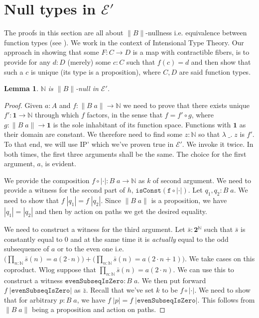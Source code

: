 \documentclass[12pt]{report}
\newtheorem{lem}[thm]{Lemma}
\theoremstyle{definition}
\begin{document}
\section{Null types in $\mathcal{E}'$}
The proofs in this section are all about $\lVert B \rVert$-nullness i.e. equivalence between function types (see ). 
We work in the context of Intensional Type Theory. 
Our approach in showing that some $F: C\rightarrow D$ is a map with contractible fibers, is to provide for any $d :D$ (merely) some $c :C$ such that $f(c) = d$ and then show that such a $c$ is unique (its type is a proposition), where $C,D$ are said function types. 
\begin{lem}\label{NisBnull}
$\mathbb{N}$ is $\lVert B \rVert$-null in $\mathcal{E}'$.
\end{lem}
\begin{proof}
Given $a : A$ and $f : \lVert B\; a \rVert \rightarrow \mathbb{N}$ we need to prove that there exists unique $f' : \mathbf{1} \rightarrow \mathbb{N}$ through which $f$ factors, in the sense that $f = f' \circ g$, where $g : \lVert B\; a \rVert \rightarrow \mathbf{1}$ is the sole inhabitant of its function space. 
Functions with $\mathbf{1}$ as their domain are constant. 
We therefore need to find some $z : \mathbb{N}$ so that $\lambda\; \_.\; z$ is $f'$. 
To that end, we will use IP' which we've proven true in $\mathcal{E}'$. 
We invoke it twice. 
In both times, the first three arguments shall be the same. 
The choice for the first argument, $a$, is evident. 

We provide the composition $f \circ |\cdot| : B\; a \rightarrow \mathbb{N}$ as $k$ of second argument. 
We need to provide a witness for the second part of $h$, $\mathtt{isConst(f \circ |\cdot|)}$. 
Let $q_1,q_2 : B\;a$. 
We need to show that $f\;|q_1| = f\; |q_2|$. 
Since $\lVert B\; a\rVert$ is a proposition, we have $|q_1| = |q_2|$ and then by action on paths we get the desired equality.

We need to construct a witness for the third argument. 
Let $\bar{s} : \mathbf{2}^\mathbb{N}$ such that $\bar{s}$ is constantly equal to $0$ and at the same time it is \textit{actually} equal to the odd subsequence of $a$ or to the even one i.e. $\big(\prod_{n : \mathbb{N}} \bar{s}(n) = a(2 \cdot n)\big) + \big(\prod_{n : \mathbb{N}} \bar{s}(n) = a(2\cdot n +1)\big)$. 
We take cases on this coproduct. 
Wlog suppose that $\prod_{n : \mathbb{N}} \bar{s}(n) = a(2 \cdot n)$. 
We can use this to construct a witness $\mathtt{evenSubseqIsZero} : B\;a$. 
We then put forward $f\;|\mathtt{evenSubseqIsZero}|$ as $\bar{z}$. 
Recall that we've set $k$ to be $f\circ |\cdot|$.
We need to show that for arbitrary $p : B\;a $, we have $f\; |p| = f\;|\mathtt{evenSubseqIsZero}|$. 
This follows from $\lVert B\;a\rVert$ being a proposition and action on paths. 


\end{proof}
\end{document}
